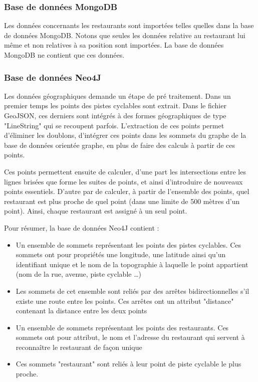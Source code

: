 \documentclass[12pt]{article}
\begin{document}
\subsubsection{Base de données MongoDB}

    Les données concernants les restaurants sont importées telles quelles dans la base de données MongoDB. Notons que seules les données relative au restaurant lui même et non relatives à sa position sont importées. La base de données MongoDB ne contient que ces données.

\subsubsection{Base de données Neo4J}

    Les données géographiques demande un étape de pré traitement. Dans un premier temps les points des pistes cyclables sont extrait. Dans le fichier GeoJSON, ces derniers sont intégrés à des formes géographiques de type "LineString" qui se recoupent parfois. L'extraction de ces points permet d'éliminer les doublons, d'intégrer ces points dans les sommets du graphe de la base de données orientée graphe, en plus de faire des calculs à partir de ces points.

    Ces points permettent ensuite de calculer, d'une part les intersections entre les lignes brisées que forme les suites de points, et ainsi d'introduire de nouveaux points essentiels. D'autre par de calculer, à partir de l'ensemble des points, quel restaurant est plus proche de quel point (dans une limite de 500 mètres d'un point). Ainsi, chaque restaurant est assigné à un seul point.
    
    Pour résumer, la base de données Neo4J contient :

    \begin{itemize}
        \item Un ensemble de sommets représentant les points des pistes cyclables. Ces sommets ont pour propriétés une longitude, une latitude ainsi qu'un identifiant unique et le nom de la topographie à laquelle le point appartient (nom de la rue, avenue, piste cyclable \dots)
        \item Les sommets de cet ensemble sont reliés par des arrêtes bidirectionnelles s'il existe une route entre les points. Ces arrêtes ont un attribut "distance" contenant la distance entre les deux points
        \item Un ensemble de sommets représentant les points des restaurants. Ces sommets ont pour attribut, le nom et l'adresse du restaurant qui servent à reconnaître le restaurant de façon unique
        \item Ces sommets "restaurant" sont reliés à leur point de piste cyclable le plus proche.
    \end{itemize}
\end{document}
